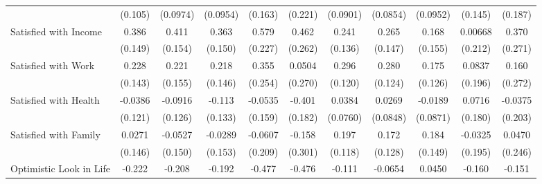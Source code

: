 {\begin{tabular}{l*{10}{c}}
            &     (0.105)         &    (0.0974)         &    (0.0954)         &     (0.163)         &     (0.221)         &    (0.0901)         &    (0.0854)         &    (0.0952)         &     (0.145)         &     (0.187)         \\
\addlinespace
Satisfied with Income&       0.386\sym{**} &       0.411\sym{**} &       0.363\sym{*}  &       0.579\sym{*}  &       0.462         &       0.241         &       0.265         &       0.168         &     0.00668         &       0.370         \\
            &     (0.149)         &     (0.154)         &     (0.150)         &     (0.227)         &     (0.262)         &     (0.136)         &     (0.147)         &     (0.155)         &     (0.212)         &     (0.271)         \\
\addlinespace
Satisfied with Work&       0.228         &       0.221         &       0.218         &       0.355         &      0.0504         &       0.296\sym{*}  &       0.280\sym{*}  &       0.175         &      0.0837         &       0.160         \\
            &     (0.143)         &     (0.155)         &     (0.146)         &     (0.254)         &     (0.270)         &     (0.120)         &     (0.124)         &     (0.126)         &     (0.196)         &     (0.272)         \\
\addlinespace
Satisfied with Health&     -0.0386         &     -0.0916         &      -0.113         &     -0.0535         &      -0.401\sym{*}  &      0.0384         &      0.0269         &     -0.0189         &      0.0716         &     -0.0375         \\
            &     (0.121)         &     (0.126)         &     (0.133)         &     (0.159)         &     (0.182)         &    (0.0760)         &    (0.0848)         &    (0.0871)         &     (0.180)         &     (0.203)         \\
\addlinespace
Satisfied with Family&      0.0271         &     -0.0527         &     -0.0289         &     -0.0607         &      -0.158         &       0.197         &       0.172         &       0.184         &     -0.0325         &      0.0470         \\
            &     (0.146)         &     (0.150)         &     (0.153)         &     (0.209)         &     (0.301)         &     (0.118)         &     (0.128)         &     (0.149)         &     (0.195)         &     (0.246)         \\
\addlinespace
Optimistic Look in Life&      -0.222\sym{**} &      -0.208\sym{*}  &      -0.192\sym{*}  &      -0.477\sym{***}&      -0.476\sym{***}&      -0.111         &     -0.0654         &      0.0450         &      -0.160         &      -0.151         \\

\end{tabular}}

